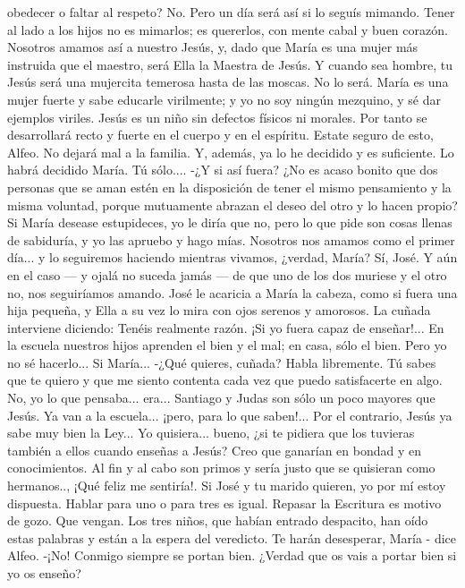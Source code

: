 \documentclass[12pt]{book} %
\begin{document}
obedecer o faltar al respeto? 
No. Pero un día será así si lo seguís mimando. 
Tener al lado a los hijos no es mimarlos; es quererlos, con mente cabal y buen corazón. Nosotros amamos así a 
nuestro Jesús, y, dado que María es una mujer más instruida que el maestro, será Ella la Maestra de Jesús. 
Y cuando sea hombre, tu Jesús será una mujercita temerosa hasta de las moscas. 
No lo será. María es una mujer fuerte y sabe educarle virilmente; y yo no soy ningún mezquino, y sé dar ejemplos 
viriles. Jesús es un niño sin defectos físicos ni morales. Por tanto se desarrollará recto y fuerte en el cuerpo y en el espíritu. Estate seguro de esto, Alfeo. No dejará mal a la familia. Y, además, ya lo he decidido y es suficiente. 
Lo habrá decidido María. Tú sólo.... 
-¿Y si así fuera? ¿No es acaso bonito que dos personas que se aman estén en la disposición de tener el mismo pensamiento y la misma voluntad, porque mutuamente abrazan el deseo del otro y lo hacen propio? Si María desease estupideces, yo le diría que no, pero lo que pide son cosas llenas de sabiduría, y yo las apruebo y hago mías. Nosotros nos amamos como el primer día... y lo seguiremos haciendo mientras vivamos, ¿verdad, María? 
Sí, José. Y aún en el caso — y ojalá no suceda jamás — de que uno de los dos muriese y el otro no, nos seguiríamos amando. 
José le acaricia a María la cabeza, como si fuera una hija pequeña, y Ella a su vez lo mira con ojos serenos y amorosos. 
La cuñada interviene diciendo: 
Tenéis realmente razón. ¡Si yo fuera capaz de enseñar!... En la escuela nuestros hijos aprenden el bien y el mal; en 
casa, sólo el bien. Pero yo no sé hacerlo... Si María... 
-¿Qué quieres, cuñada? Habla libremente. Tú sabes que te quiero y que me siento contenta cada vez que puedo 
satisfacerte en algo. 
No, yo lo que pensaba... era... Santiago y Judas son sólo un poco mayores que Jesús. Ya van a la escuela... ¡pero, para 
lo que saben!... Por el contrario, Jesús ya sabe muy bien la Ley... Yo quisiera... bueno, ¿si te pidiera que los tuvieras también a ellos cuando enseñas a Jesús? Creo que ganarían en bondad y en conocimientos. Al fin y al cabo son primos y sería justo que se quisieran como hermanos.., ¡Qué feliz me sentiría!. 
Si José y tu marido quieren, yo por mí estoy dispuesta. Hablar para uno o para tres es igual. Repasar la Escritura es motivo de gozo. Que vengan. 
Los tres niños, que habían entrado despacito, han oído estas palabras y están a la espera del veredicto. 
Te harán desesperar, María - dice Alfeo. 
-¡No! Conmigo siempre se portan bien. ¿Verdad que os vais a portar bien si yo os enseño? 
\end{document}

